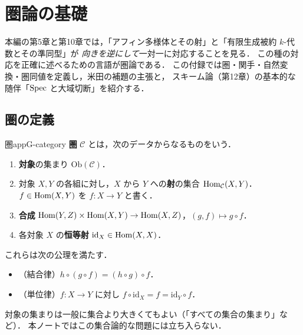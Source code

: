 \chapter{圏論の基礎}\label{app:G}

本編の第5章と第10章では，「アフィン多様体とその射」と「有限生成被約 $k$-代数とその準同型」が
\emph{向きを逆にして}一対一に対応することを見る．
この種の対応を正確に述べるための言語が圏論である．
この付録では圏・関手・自然変換・圏同値を定義し，米田の補題の主張と，
スキーム論（第12章）の基本的な随伴「$\operatorname{Spec}$ と大域切断」を紹介する．

\section{圏の定義}

\begin{mydef}{圏}{appG-category}
\textbf{圏} $\mathcal C$ とは，次のデータからなるものをいう．
\begin{enumerate}
\item \textbf{対象}の集まり $\mathrm{Ob}(\mathcal C)$．
\item 対象 $X,Y$ の各組に対し，$X$ から $Y$ への\textbf{射}の集合 $\operatorname{Hom}_{\mathcal C}(X,Y)$．$f\in\operatorname{Hom}(X,Y)$ を $f\colon X\to Y$ と書く．
\item \textbf{合成} $\operatorname{Hom}(Y,Z)\times\operatorname{Hom}(X,Y)\to\operatorname{Hom}(X,Z)$，$(g,f)\mapsto g\circ f$．
\item 各対象 $X$ の\textbf{恒等射} $\mathrm{id}_X\in\operatorname{Hom}(X,X)$．
\end{enumerate}
これらは次の公理を満たす．
\begin{itemize}
\item（結合律）$h\circ(g\circ f)=(h\circ g)\circ f$．
\item（単位律）$f\colon X\to Y$ に対し $f\circ\mathrm{id}_X=f=\mathrm{id}_Y\circ f$．
\end{itemize}
\end{mydef}

対象の集まりは一般に集合より大きくてもよい（「すべての集合の集まり」など）．
本ノートではこの集合論的な問題には立ち入らない．

